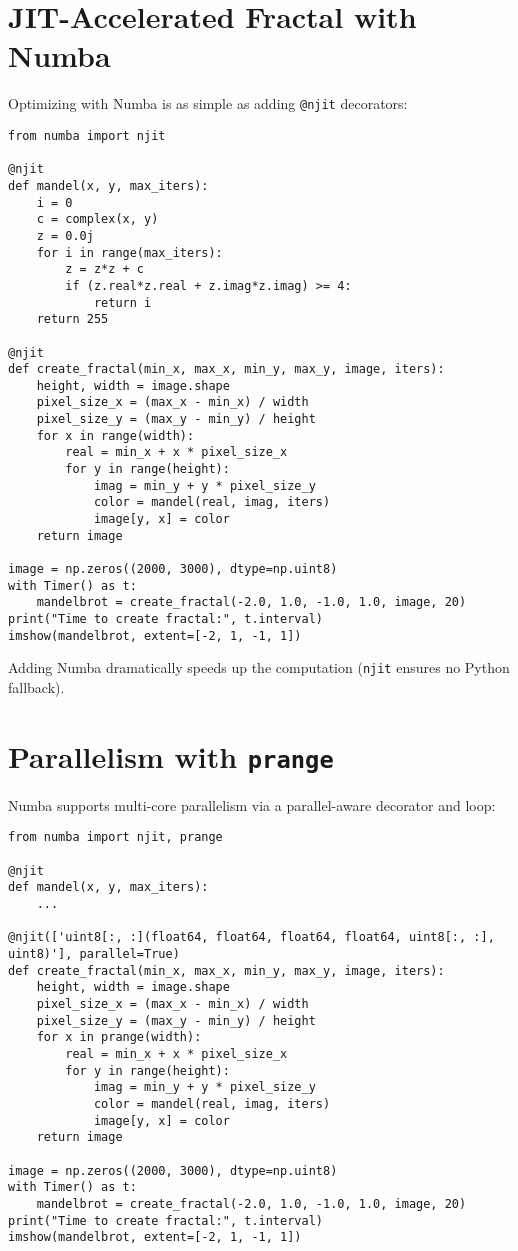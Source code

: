 \documentclass{book}
\begin{document}
\section{JIT-Accelerated Fractal with Numba}

Optimizing with Numba is as simple as adding \texttt{@njit} decorators:

\begin{lstlisting}
from numba import njit

@njit
def mandel(x, y, max_iters):
    i = 0
    c = complex(x, y)
    z = 0.0j
    for i in range(max_iters):
        z = z*z + c
        if (z.real*z.real + z.imag*z.imag) >= 4:
            return i
    return 255

@njit
def create_fractal(min_x, max_x, min_y, max_y, image, iters):
    height, width = image.shape
    pixel_size_x = (max_x - min_x) / width
    pixel_size_y = (max_y - min_y) / height
    for x in range(width):
        real = min_x + x * pixel_size_x
        for y in range(height):
            imag = min_y + y * pixel_size_y
            color = mandel(real, imag, iters)
            image[y, x] = color
    return image

image = np.zeros((2000, 3000), dtype=np.uint8)
with Timer() as t:
    mandelbrot = create_fractal(-2.0, 1.0, -1.0, 1.0, image, 20)
print("Time to create fractal:", t.interval)
imshow(mandelbrot, extent=[-2, 1, -1, 1])
\end{lstlisting}

Adding Numba dramatically speeds up the computation (\texttt{njit} ensures no Python fallback).

\section{Parallelism with \texttt{prange}}
Numba supports multi-core parallelism via a parallel-aware decorator and loop:

\begin{lstlisting}
from numba import njit, prange

@njit
def mandel(x, y, max_iters):
    ...

@njit(['uint8[:, :](float64, float64, float64, float64, uint8[:, :], uint8)'], parallel=True)
def create_fractal(min_x, max_x, min_y, max_y, image, iters):
    height, width = image.shape
    pixel_size_x = (max_x - min_x) / width
    pixel_size_y = (max_y - min_y) / height
    for x in prange(width):
        real = min_x + x * pixel_size_x
        for y in range(height):
            imag = min_y + y * pixel_size_y
            color = mandel(real, imag, iters)
            image[y, x] = color
    return image

image = np.zeros((2000, 3000), dtype=np.uint8)
with Timer() as t:
    mandelbrot = create_fractal(-2.0, 1.0, -1.0, 1.0, image, 20)
print("Time to create fractal:", t.interval)
imshow(mandelbrot, extent=[-2, 1, -1, 1])
\end{lstlisting}
\end{document}
